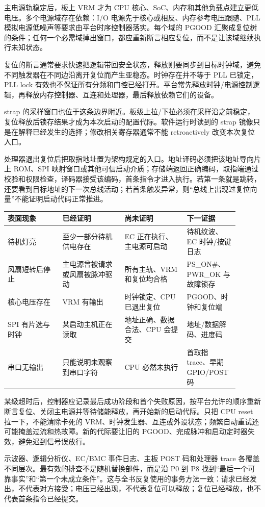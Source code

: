 主电源轨稳定后，板上 VRM 才为 CPU 核心、SoC、内存和其他负载点建立更低电压。多个电源域存在依赖：I/O 电源先于核心或相反、内存参考电压跟随、PLL 模拟电源低噪声等要求由平台时序控制器落实。每个域的 PGOOD 汇聚成复位树的条件；任何一个必需域掉出窗口，都应重新断言相应复位，而不是让该域继续执行未知状态。


复位的断言通常要求快速把逻辑带回安全状态，释放则要同步到目标时钟域，避免不同触发器在不同边沿离开复位而产生亚稳态。时钟存在并不等于 PLL 已锁定，PLL lock 有效也不保证所有分频和门控已经打开。平台常先释放时钟/电源控制逻辑，再释放内存控制器、互连和处理器，最后释放依赖它们的设备。

strap 的采样窗口也位于这条边界附近。板级上拉/下拉必须在采样沿之前稳定，复位释放后锁存结果才成为本次启动的配置代际。软件运行时读到的 strap 镜像只是在解释已经发生的选择；修改相关寄存器通常不能 retroactively 改变本次复位入口。


处理器退出复位后把取指地址置为架构规定的入口。地址译码必须把该地址导向片上 ROM、SPI 映射窗口或其他可信启动介质；存储端返回正确编码，取指端通过校验和权限检查，译码器接受该编码，首条指令才进入执行。若第一条就是跳转，还要看到目标地址的下一次总线活动；若首条触发异常，则“总线上出现过复位向量”不能证明启动代码正常推进。

\Needspace{0.34\textheight}
\begin{longtable}{L{0.22\linewidth}L{0.25\linewidth}L{0.25\linewidth}L{0.18\linewidth}}
\toprule
表面现象 & 已经证明 & 尚未证明 & 下一证据 \\
\midrule
待机灯亮 & 至少一部分待机供电存在 & EC 正在执行、主电源可启动 & 待机纹波、EC 时钟/按键日志 \\\tablerowrule
风扇短转后停止 & 主电源曾被请求或风扇被脉冲驱动 & 所有主轨、VRM 和复位均合格 & PS\_ON\#、PWR\_OK 与故障锁存 \\\tablerowrule
核心电压存在 & VRM 有输出 & 时钟锁定、CPU 已退出复位 & PGOOD、时钟和复位端 \\\tablerowrule
SPI 有片选与时钟 & 某启动主机正在读取 & 地址正确、数据合法、CPU 会提交 & 地址/数据解码、进度码 \\\tablerowrule
串口无输出 & 只能说明未观察到串口字符 & CPU 必然未执行 & 首取指 trace、早期 GPIO/POST 码 \\
\bottomrule
\end{longtable}


某级超时后，控制器应记录最后成功阶段和首个失败原因，按平台允许的顺序重新断言复位、关闭主电源并等待储能释放，再开始新的启动代际。只把 CPU reset 拉一下，不能清除卡死的 VRM、时钟发生器、互连或外设状态；频繁自动重试还可能掩盖过流和热故障。新的代际要让旧的 PGOOD、完成脉冲和启动定时器失效，避免迟到信号误放行。

示波器、逻辑分析仪、EC/BMC 事件日志、主板 POST 码和处理器 trace 各覆盖不同层次。最有效的排查不是随机替换部件，而是沿 P0 到 P8 找到“最后一个可靠事实”和“第一个未成立条件”。这与全书反复使用的事务方法一致：请求已经发出，不代表对方接受；电压已经出现，不代表复位可以释放；复位已经释放，也不代表首条指令已经提交。
